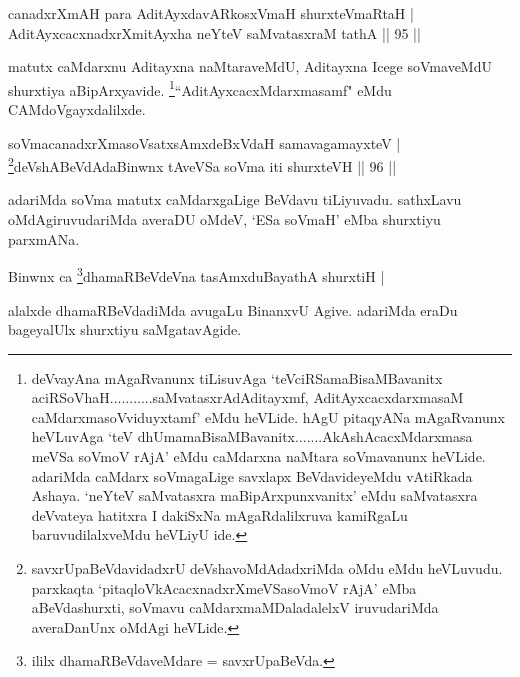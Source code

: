 \begin{shl}
canadxrXmAH para AditAyxdavARkosxVmaH shurxteVmaRtaH | \\
AditAyxcacxnadxrXmitAyxha neYteV saMvatasxraM tathA \hfill|| 95 || 
\end{shl}

\begin{artha}
matutx caMdarxnu Aditayxna naMtaraveMdU, Aditayxna Icege soVmaveMdU shurxtiya aBipArxyavide. \footnote{deVvayAna mAgaRvanunx tiLisuvAga `teVciRSamaBisaMBavanitx aciRSoV\s haH...........saMvatasxrAdAditayxmf, AditAyxcacxdarxmasaM caMdarxmasoVviduyxtamf' eMdu heVLide. hAgU pitaqyANa mAgaRvanunx heVLuvAga `teV dhUmamaBisaMBavanitx.......AkAshAcacxMdarxmasa meVSa soVmoV rAjA' eMdu caMdarxna naMtara soVmavanunx heVLide. adariMda caMdarx soVmagaLige savxlapx BeVdavideyeMdu vAtiRkada Ashaya. `neYteV saMvatasxra maBipArxpunxvanitx' eMdu saMvatasxra deVvateya hatitxra I dakiSxNa mAgaRdalilxruva kamiRgaLu baruvudilalxveMdu heVLiyU ide.}``AditAyxcacxMdarxmasamf" eMdu CAMdoVgayxdalilxde.
\end{artha}


\begin{shl}
soVmacanadxrXmasoVsatxsAmxdeBxVdaH samavagamayxteV | \\
\footnote{savxrUpaBeVdavidadxrU deVshavoMdAdadxriMda oMdu eMdu heVLuvudu. parxkaqta `pitaqloVkAcacxnadxrXmeVSasoVmoV rAjA' eMba aBeVdashurxti, soVmavu caMdarxmaMDaladalelxV iruvudariMda averaDanUnx oMdAgi heVLide.}deVshABeVdAdaBinwnx tAveVSa soVma iti shurxteVH \hfill|| 96 || 
\end{shl}

\begin{artha}
adariMda soVma matutx caMdarxgaLige BeVdavu tiLiyuvadu. sathxLavu 
oMdAgiruvudariMda averaDU oMdeV, `ESa soVmaH' eMba shurxtiyu parxmANa.
\end{artha}



\begin{shl}
Binwnx ca \footnote{ililx dhamaRBeVdaveMdare = savxrUpaBeVda.}dhamaRBeVdeVna tasAmxduBayathA shurxtiH | \\
\end{shl}

\begin{artha}
alalxde dhamaRBeVdadiMda avugaLu BinanxvU Agive. adariMda eraDu bageyalUlx shurxtiyu saMgatavAgide. 
\end{artha}

